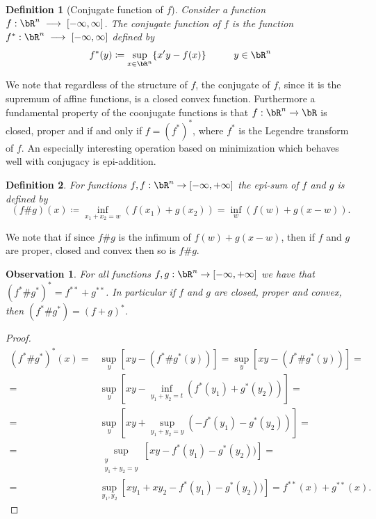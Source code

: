 \documentclass[11pt,a4paper,oneside,openany]{book}
\newtheorem{definition}{Definition}
\newtheorem{observation}[theorem]{Observation}
\numberwithin{definition}{section}
\numberwithin{theorem}{section}
\numberwithin{problem}{section}
\newcommand{\la}{\; \longrightarrow \;}
\begin{document}
\begin{definition}[Conjugate function of $f$]
    Consider a function $f: \bR^n \la [-\infty, \infty]$. The \emph{conjugate function of $f$} is the function $f^*: \bR^n \la [-\infty, \infty]$ defined by
    \begin{equation}
        f^*(y) \coloneqq \sup_{x \in \bR^n}\{x'y - f(x)\} \hspace{1cm} y \in \bR^n
    \end{equation}
\end{definition}


We note that regardless of the structure of $f$, the conjugate of $f$, since it is the supremum of affine functions, is a closed convex function. Furthermore a fundamental property of the coonjugate functions is that  $f:\bR^n \to \bR$ is closed, proper and if and only if $f=(f^*)^*$, where $f^*$ is the Legendre transform of $f$.
An especially interesting operation based on minimization which behaves well with conjugacy is epi-addition.
\begin{definition} 
    For functions \(f,f:\bR^n \to [-\infty,+\infty]\) the epi-sum of \(f\)  and \(g\) is defined by
    \begin{equation}
        (f\#g)(x) \coloneqq \inf_{x_1+x_2=w}(f(x_1)+g(x_2)) = \inf_{w}(f(w)+g(x-w)).
    \end{equation}
\end{definition}
We note that if since $f\#g$ is the infimum of \(f(w) + g(x-w)\), then if \(f\) and \(g\) are proper, closed and convex then so is \(f\#g\).
\begin{observation} \label{epi addition commutation}
     For all functions \(f,g:\bR^n \to [-\infty,+\infty]\) we have that \((f^*\#g^*)^*=f^{**}+g^{**}\). In particular if \(f\) and \(g\) are closed, proper and convex, then  \((f^*\#g^*)=(f+g)^*\).
\end{observation}
\begin{proof}
    \begin{align*}
        (f^*\#g^*)^*(x) =& \sup_{y}[xy-(f^*\#g^*(y))]= \sup_{y}[xy-(f^*\#g^*(y))]=\\ 
        =&\sup_{y}[xy-\inf_{y_1+y_2=t}(f^*(y_1)+g^*(y_2))]= \\
        =&\sup_{y}[xy+\sup_{y_1+y_2=y}(-f^*(y_1)-g^*(y_2))]=\\
        =&\sup_{\substack{y \\ y_1+y_2 = y}}[xy-f^*(y_1)-g^*(y_2))] = \\
        =&\sup_{y_1,y_2}[xy_1+xy_2 -f^*(y_1)-g^*(y_2))]= f^{**}(x)+g^{**}(x).
    \end{align*}
\end{proof}
\end{document}
